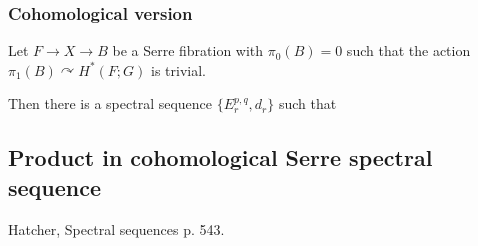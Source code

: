 \begin{definition}
\subsubsection{Cohomological version}

\begin{theorem}
	Let $F\to X\to B$ be a Serre fibration with $\pi_0(B)=0$ such that the action $\pi_1(B)\curvearrowright H^*(F;G)$ is trivial.

	Then there is a spectral sequence $\{E_r^{p,q},d_r\}$ such that
\begin{itemize}
	\item $$d_r:E_r^{p,q}\to E_r^{p+r,q-r+1}\qquad\textand} \qquad  E_{r+1}^{p,q}=\ker d_r/\img d_r.$$
	\item The groups
		$$F^pH^n:=\img (F^pH^n\to F^nH^n=H^n(X))$$
	form a filtration
	$$H^{n}(X)=F^0H^n\supset F^1H^n\supset \ldots\supset F^nH^n\supset \varnothing $$

	of $H^{n}(X,G)$ such that
	$$E_{\infty}^{p,q}\cong F^pH^{p+q}/F^{p+1}H^{p+q}.$$
\item $$E^{p,q}_2\cong H^p(B,H^{q}(F,G)).$$
\end{itemize}
\end{theorem}

\subsection{Product in cohomological Serre spectral sequence}
Hatcher, Spectral sequences p. 543.


\end{definition}
